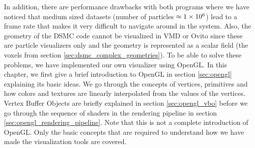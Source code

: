 In addition, there are performance drawbacks with both programs where we have noticed that medium sized datasets (number of particles $\approx 1\times 10^{6}$) lead to a frame rate that makes it very difficult to navigate around in the system. Also, the geometry of the DSMC code cannot be visualized in VMD or Ovito since these are particle visualizers only and the geometry is represented as a scalar field (the voxels from section \ref{sec:dsmc_complex_geometries}). To be able to solve these problems, we have implemented our own visualizer using OpenGL. In this chapter, we first give a brief introduction to OpenGL in section \ref{sec:opengl} explaining its basic ideas. We go through the concepts of vertices, primitives and how colors and textures are linearly interpolated from the values of the vertices. Vertex Buffer Objects are briefly explained in section \ref{sec:opengl_vbo} before we go through the sequence of shaders in the rendering pipeline in section \ref{sec:opengl_rendering_pipeline}. Note that this is not a complete introduction of OpenGL. Only the basic concepts that are required to understand how we have made the visualization tools are covered.